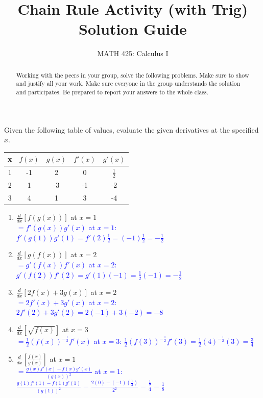 \documentclass{ximera}
\title{Chain Rule Activity (with Trig) Solution Guide}  %
\author{MATH 425: Calculus I}
\begin{document}
\begin{abstract}
    Working with the peers in your group, solve the following problems. Make sure to show and justify all your work. Make sure everyone in the group understands the solution and participates. Be prepared to report your answers to the whole class. 
\end{abstract}
\maketitle


\begin{exercise}
    Given the following table of values, evaluate the given derivatives at the specified $x$.\\
    \begin{tabular}{c|c|c|c|c}
        x & $f(x)$ & $g(x)$ & $f'(x)$ & $g'(x)$  \\ \hline
        1 & -1 & 2 & 0 & $\frac{1}{2}$\\
        2 & 1 & -3 & -1 & -2 \\
        3 & 4 & 1 & 3 & -4 
    \end{tabular}
    \begin{enumerate}
        \item[a.] $\frac{d}{dx}[f(g(x))]$ at $x=1$\\
        \textcolor{blue}{ $=f'(g(x))g'(x)$ at $x=1$: $f'(g(1))g'(1)=f'(2)\frac12=(-1)\frac12=-\frac12$}

        \item[b.] $\frac{d}{dx}[g(f(x))]$ at $x=2$\\
        \textcolor{blue}{ $=g'(f(x))f'(x)$ at $x=2$: $g'(f(2))f'(2)=g'(1)(-1)=\frac12(-1)=-\frac12$}

        \item[c.] $\frac{d}{dx}[2f(x)+3g(x)]$ at $x=2$\\
        \textcolor{blue}{ $=2f'(x)+3g'(x)$ at $x=2$: $2f'(2)+3g'(2)=2(-1)+3(-2)=-8$}

        \item[d.] $\frac{d}{dx}[\sqrt{f(x)}]$ at $x=3$\\
        \textcolor{blue}{ $=\frac12(f(x))^{-\frac12}f'(x)$ at $x=3$: $\frac12(f(3))^{-\frac12}f'(3)=\frac12(4)^{-\frac12}(3)=\frac34$}

        \item[e.] $\frac{d}{dx}[\frac{f(x)}{g(x)}]$ at $x=1$\\
        \textcolor{blue}{ $=\frac{g(x)f'(x)-f(x)g'(x)}{(g(x))^2}$ at $x=1$: $\frac{g(1)f'(1)-f(1)g'(1)}{(g(1))^2}=\frac{2(0)-(-1)(\frac12)}{2^2}=\frac{\frac{1}{2}}{4}=\frac18$}


\end{enumerate}
\end{exercise}
\end{document}
